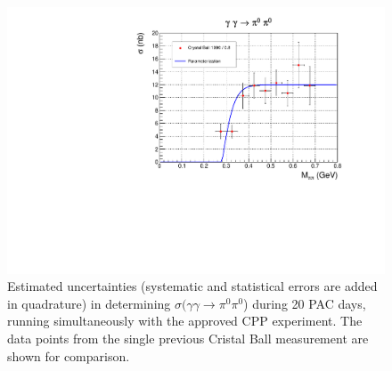 \begin{figure}[tpb]
\centering
\includegraphics[page=4,width=4.75in]{figures/sigma_2pi0_figs.pdf}
\caption{Estimated uncertainties (systematic and statistical errors are added in quadrature) in determining $\sigma(\gamma\gamma\rightarrow\pi^0\pi^0$) during 20 PAC days, running simultaneously with the approved CPP experiment. The data points from the single previous Cristal Ball measurement \cite{Marsiske:1990hx} are shown for comparison.
\label{fig:sigma_2pi0_figs_4}}
\end{figure}





